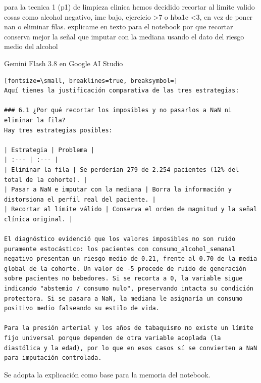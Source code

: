 \documentclass[12pt,a4paper,oneside]{book}
\begin{document}
\begin{iaprompt}
para la tecnica 1 (p1) de limpieza clinica hemos decidido recortar al limite valido cosas como alcohol negativo, imc bajo, ejercicio >7 o hba1c <3, en vez de poner nan o eliminar filas. explicame en texto para el notebook por que recortar conserva mejor la señal que imputar con la mediana usando el dato del riesgo medio del alcohol
\end{iaprompt}
\begin{iaresp}{Gemini Flash 3.8 en Google AI Studio}
\begin{Verbatim}[fontsize=\small, breaklines=true, breaksymbol=]
Aquí tienes la justificación comparativa de las tres estrategias:

### 6.1 ¿Por qué recortar los imposibles y no pasarlos a NaN ni eliminar la fila?
Hay tres estrategias posibles:

| Estrategia | Problema |
| :--- | :--- |
| Eliminar la fila | Se perderían 279 de 2.254 pacientes (12% del total de la cohorte). |
| Pasar a NaN e imputar con la mediana | Borra la información y distorsiona el perfil real del paciente. |
| Recortar al límite válido | Conserva el orden de magnitud y la señal clínica original. |

El diagnóstico evidenció que los valores imposibles no son ruido puramente estocástico: los pacientes con consumo_alcohol_semanal negativo presentan un riesgo medio de 0.21, frente al 0.70 de la media global de la cohorte. Un valor de -5 procede de ruido de generación sobre pacientes no bebedores. Si se recorta a 0, la variable sigue indicando "abstemio / consumo nulo", preservando intacta su condición protectora. Si se pasara a NaN, la mediana le asignaría un consumo positivo medio falseando su estilo de vida.

Para la presión arterial y los años de tabaquismo no existe un límite fijo universal porque dependen de otra variable acoplada (la diastólica y la edad), por lo que en esos casos sí se convierten a NaN para imputación controlada.
\end{Verbatim}
\end{iaresp}
\begin{iaanalisis}
Se adopta la explicación como base para la memoria del notebook.
\end{iaanalisis}
\end{document}
